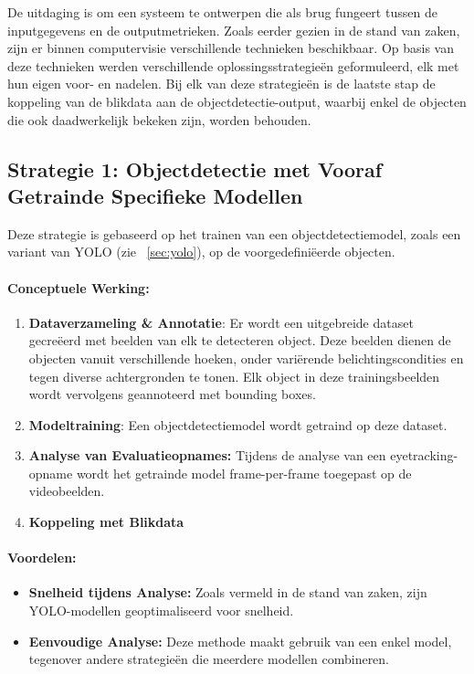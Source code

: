 De uitdaging is om een systeem te ontwerpen die als brug fungeert tussen de inputgegevens en de outputmetrieken.
Zoals eerder gezien in de stand van zaken, zijn er binnen computervisie verschillende technieken beschikbaar.
Op basis van deze technieken werden verschillende oplossingsstrategieën geformuleerd, elk met hun eigen voor- en nadelen.
Bij elk van deze strategieën is de laatste stap de koppeling van de blikdata aan de objectdetectie-output, 
waarbij enkel de objecten die ook daadwerkelijk bekeken zijn, worden behouden.

\subsection{Strategie 1: Objectdetectie met Vooraf Getrainde Specifieke Modellen}

Deze strategie is gebaseerd op het trainen van een objectdetectiemodel, zoals een variant van YOLO (zie ~\ref{sec:yolo}), 
op de voorgedefiniëerde objecten.

\paragraph{Conceptuele Werking:}
\begin{enumerate}
    \item \textbf{Dataverzameling \& Annotatie}: Er wordt een uitgebreide dataset gecreëerd met beelden van elk te detecteren object. 
    Deze beelden dienen de objecten vanuit verschillende hoeken, onder variërende belichtingscondities en tegen diverse achtergronden te tonen. 
    Elk object in deze trainingsbeelden wordt vervolgens geannoteerd met bounding boxes.
    \item \textbf{Modeltraining}: Een objectdetectiemodel wordt getraind op deze dataset.
    \item \textbf{Analyse van Evaluatieopnames:} Tijdens de analyse van een eyetracking-opname wordt het getrainde model frame-per-frame 
    toegepast op de videobeelden. 
    \item \textbf{Koppeling met Blikdata}
\end{enumerate}

\paragraph{Voordelen:}
\begin{itemize}
    \item \textbf{Snelheid tijdens Analyse:} Zoals vermeld in de stand van zaken, zijn YOLO-modellen geoptimaliseerd voor snelheid.
    \item \textbf{Eenvoudige Analyse:} Deze methode maakt gebruik van een enkel model, tegenover andere strategieën die meerdere modellen combineren.
\end{itemize}

